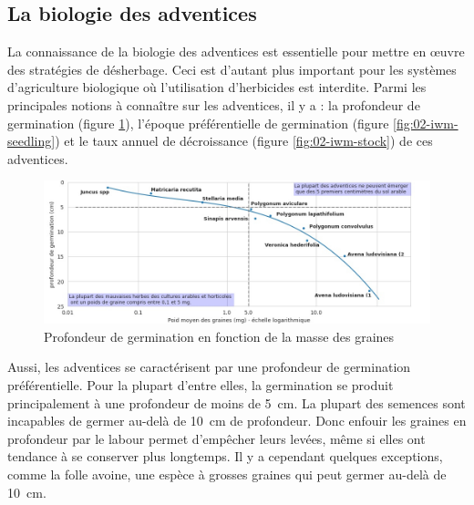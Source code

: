 \documentclass[../thesis.tex]{subfiles}
\begin{document}
    \vfill 
    \newpage
    \subsection{La biologie des adventices}
    
    La connaissance de la biologie des adventices est essentielle pour mettre en œuvre des stratégies de désherbage. Ceci est d'autant plus important pour les systèmes d'agriculture biologique où l'utilisation d'herbicides est interdite. Parmi les principales notions à connaître sur les adventices, il y a : la profondeur de germination (figure \ref{fig:02-iwm-depth}), l'époque préférentielle de germination (figure \ref{fig:02-iwm-seedling}) et le taux annuel de décroissance (figure \ref{fig:02-iwm-stock}) de ces adventices.
    
    \vfill
    \begin{figure}[H]
        \centering
        \includegraphics[width=\linewidth]{img/intro/iwm-depth-3}
        \caption{Profondeur de germination en fonction de la masse des graines}
        \label{fig:02-iwm-depth}
    \end{figure}
    \vfill
    
    Aussi, les adventices se caractérisent par une profondeur de germination préférentielle. Pour la plupart d'entre elles, la germination se produit principalement à une profondeur de moins de \SI{5}{cm}. La plupart des semences sont incapables de germer au-delà de \SI{10}{cm} de profondeur. Donc enfouir les graines en profondeur par le labour permet d'empêcher leurs levées, même si elles ont tendance à se conserver plus longtemps. Il y a cependant quelques exceptions, comme la folle avoine, une espèce à grosses graines qui peut germer au-delà de \SI{10}{cm}.
    
\end{document}
